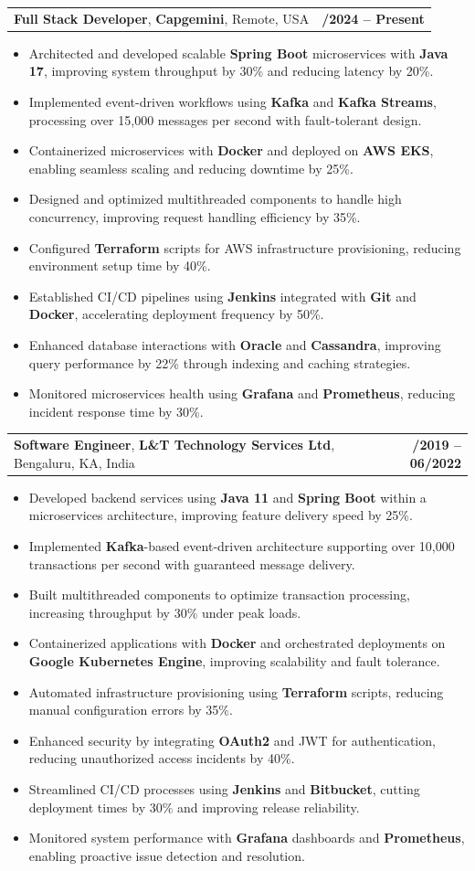 \documentclass[letterpaper,11pt]{article}
\makeatletter
\newcommand{\resumeItem}[1]{
  \item\footnotesize{
    {#1 \vspace{-2pt}}
  }
}
\newcommand{\resumeSubheading}[4]{
  \vspace{-2pt}\item
    \begin{tabular*}{1.0\textwidth}[t]{l@{\extracolsep{\fill}}r}
      \textbf{\fontsize{10pt}{14pt}\selectfont #3}, \textbf{\fontsize{10pt}{14pt}\selectfont #1}, \fontsize{10pt}{14pt}\selectfont #4 & \textbf{\fontsize{10pt}{14pt}\selectfont #2} \\
    \end{tabular*}\vspace{-7pt}
}
\newcommand{\resumeItemListStart}{\begin{itemize}[leftmargin=*]}
\newcommand{\resumeItemListEnd}{\end{itemize}\vspace{-5pt}}
\makeatother
\begin{document}
    \resumeSubheading
        {Capgemini}{01/2024 -- Present}
        {Full Stack Developer}{Remote, USA}
      \resumeItemListStart
        \resumeItem{Architected and developed scalable \textbf{Spring Boot} microservices with \textbf{Java 17}, improving system throughput by 30\% and reducing latency by 20\%.}
        \resumeItem{Implemented event-driven workflows using \textbf{Kafka} and \textbf{Kafka Streams}, processing over 15,000 messages per second with fault-tolerant design.}
        \resumeItem{Containerized microservices with \textbf{Docker} and deployed on \textbf{AWS EKS}, enabling seamless scaling and reducing downtime by 25\%.}
        \resumeItem{Designed and optimized multithreaded components to handle high concurrency, improving request handling efficiency by 35\%.}
        \resumeItem{Configured \textbf{Terraform} scripts for AWS infrastructure provisioning, reducing environment setup time by 40\%.}
        \resumeItem{Established CI/CD pipelines using \textbf{Jenkins} integrated with \textbf{Git} and \textbf{Docker}, accelerating deployment frequency by 50\%.}
        \resumeItem{Enhanced database interactions with \textbf{Oracle} and \textbf{Cassandra}, improving query performance by 22\% through indexing and caching strategies.}
        \resumeItem{Monitored microservices health using \textbf{Grafana} and \textbf{Prometheus}, reducing incident response time by 30\%.}
      \resumeItemListEnd

    \resumeSubheading
        {L\&T Technology Services Ltd}{08/2019 -- 06/2022}
        {Software Engineer}{Bengaluru, KA, India}
      \resumeItemListStart
        \resumeItem{Developed backend services using \textbf{Java 11} and \textbf{Spring Boot} within a microservices architecture, improving feature delivery speed by 25\%.}
        \resumeItem{Implemented \textbf{Kafka}-based event-driven architecture supporting over 10,000 transactions per second with guaranteed message delivery.}
        \resumeItem{Built multithreaded components to optimize transaction processing, increasing throughput by 30\% under peak loads.}
        \resumeItem{Containerized applications with \textbf{Docker} and orchestrated deployments on \textbf{Google Kubernetes Engine}, improving scalability and fault tolerance.}
        \resumeItem{Automated infrastructure provisioning using \textbf{Terraform} scripts, reducing manual configuration errors by 35\%.}
        \resumeItem{Enhanced security by integrating \textbf{OAuth2} and JWT for authentication, reducing unauthorized access incidents by 40\%.}
        \resumeItem{Streamlined CI/CD processes using \textbf{Jenkins} and \textbf{Bitbucket}, cutting deployment times by 30\% and improving release reliability.}
        \resumeItem{Monitored system performance with \textbf{Grafana} dashboards and \textbf{Prometheus}, enabling proactive issue detection and resolution.}
      \resumeItemListEnd
\end{document}
